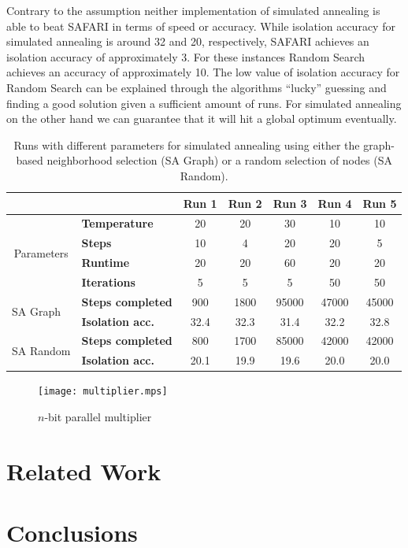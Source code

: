 \documentclass{article}
\begin{document}
Contrary to the assumption neither implementation of simulated
annealing is able to beat SAFARI in terms of speed or accuracy. While
isolation accuracy for simulated annealing is around 32 and 20,
respectively, SAFARI achieves an isolation accuracy of approximately
3. For these instances Random Search achieves an accuracy of
approximately 10. The low value of isolation accuracy for Random
Search can be explained through the algorithms ``lucky'' guessing and
finding a good solution given a sufficient amount of runs. For
simulated annealing on the other hand we can guarantee that it will
hit a global optimum eventually.
\begin{table}[htb]
	\centering	
	\begin{tabular}{|l|l|c|c|c|c|c|}
		\hline
		\multicolumn{2}{|l|}{}                                                       & \textbf{Run 1} & \textbf{Run 2} & \textbf{Run 3} & \textbf{Run 4} & \textbf{Run 5} \\ \hline
		\multicolumn{1}{|c|}{\multirow{4}{*}{Parameters}} & \textbf{Temperature}     & 20             & 20             & 30             & 10             & 10             \\ \cline{2-7} 
		\multicolumn{1}{|c|}{}                            & \textbf{Steps}           & 10             & 4              & 20             & 20             & 5              \\ \cline{2-7} 
		\multicolumn{1}{|c|}{}                            & \textbf{Runtime}         & 20             & 20             & 60             & 20             & 20             \\ \cline{2-7} 
		\multicolumn{1}{|c|}{}                            & \textbf{Iterations}      & 5              & 5              & 5              & 50             & 50             \\ \hline
		\multirow{2}{*}{SA Graph}                         & \textbf{Steps completed} & 900          & 1800          & 95000         & 47000          & 45000            \\ \cline{2-7} 
		& \textbf{Isolation acc.}  & 32.4          &    32.3       & 31.4           & 32.2           & 32.8         \\ \hline
		\multirow{2}{*}{SA Random}                        & \textbf{Steps completed} & 800          & 1700          & 85000          & 42000          & 42000\\ \cline{2-7} 
		& \textbf{Isolation acc.}  & 20.1         & 19.9          & 19.6          & 20.0           & 20.0           \\ \hline
	\end{tabular}
	\caption{Runs with different parameters for simulated annealing using either the graph-based neighborhood selection (SA Graph) or a random selection of nodes (SA Random).\label{tbl:resGraph}}
\end{table}
\begin{figure}[htb]
\centering
\texttt{[image: multiplier.mps]}
\caption{$n$-bit parallel multiplier\label{fig:multiplier}}
\end{figure}
%
\section{Related Work}
\section{Conclusions}
\end{document}
